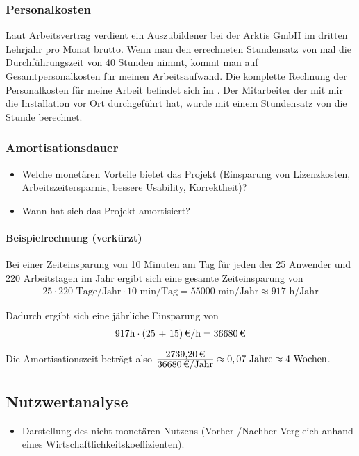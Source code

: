 \subsubsection{Personalkosten}
Laut Arbeitsvertrag verdient ein Auszubildener bei der Arktis GmbH im dritten Lehrjahr pro Monat  brutto. 
Wenn man den errechneten Stundensatz von  mal die Durchführungszeit von 40 Stunden nimmt, kommt man auf  Gesamtpersonalkosten für meinen Arbeitsaufwand. Die komplette Rechnung der Personalkosten für meine Arbeit befindet sich im . 
Der Mitarbeiter der mit mir die Installation vor Ort durchgeführt hat, wurde mit einem Stundensatz von  die Stunde berechnet.  

\subsubsection{Amortisationsdauer}
\label{sec:Amortisationsdauer}
\begin{itemize}
	\item Welche monetären Vorteile bietet das Projekt (\zB Einsparung von Lizenzkosten, Arbeitszeitersparnis, bessere Usability, Korrektheit)?
	\item Wann hat sich das Projekt amortisiert?
\end{itemize}

\paragraph{Beispielrechnung (verkürzt)}
Bei einer Zeiteinsparung von 10 Minuten am Tag für jeden der 25 Anwender und 220 Arbeitstagen im Jahr ergibt sich eine gesamte Zeiteinsparung von 
\begin{eqnarray}
25 \cdot 220 \mbox{ Tage/Jahr} \cdot 10 \mbox{ min/Tag} = 55000 \mbox{ min/Jahr} \approx 917 \mbox{ h/Jahr} 
\end{eqnarray}

Dadurch ergibt sich eine jährliche Einsparung von 
\begin{eqnarray}
917 \mbox{h} \cdot \eur{(25 + 15)}{\mbox{/h}} = \eur{36680}
\end{eqnarray}

Die Amortisationszeit beträgt also $\frac{\eur{2739,20}}{\eur{36680}\mbox{/Jahr}} \approx 0,07 \mbox{ Jahre} \approx 4 \mbox{ Wochen}$.


\subsection{Nutzwertanalyse}
\label{sec:Nutzwertanalyse}
\begin{itemize}
	\item Darstellung des nicht-monetären Nutzens (\zB Vorher-/Nachher-Vergleich anhand eines Wirtschaftlichkeitskoeffizienten). 
\end{itemize}

